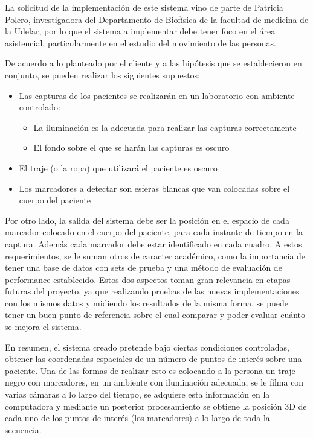 La solicitud de la implementación de este sistema vino de parte de Patricia Polero, investigadora del Departamento de Biofísica de la facultad de medicina de la Udelar, por lo que el sistema a implementar debe tener foco en el área asistencial, particularmente en el estudio del movimiento de las personas.

De acuerdo a lo planteado por el cliente y a las hipótesis que se establecieron en conjunto, se pueden realizar los siguientes supuestos:
\begin{itemize}
\item Las capturas de los pacientes se realizarán en un laboratorio con ambiente controlado:
	\begin{itemize}
		 \item La iluminación es la adecuada para realizar las  capturas correctamente
		 \item El fondo sobre el que se harán las capturas es oscuro
	\end{itemize}
\item El traje (o la ropa) que utilizará el paciente es oscuro
\item Los marcadores a detectar son esferas blancas que van colocadas sobre el cuerpo del paciente
\end{itemize}

Por otro lado, la salida del sistema debe ser la posición en el espacio de cada marcador colocado en el cuerpo del paciente, para cada instante de tiempo en la captura. Además cada marcador debe estar identificado en cada cuadro. A estos requerimientos, se le suman otros de caracter académico, como la importancia de tener una base de datos con sets de prueba y una método de evaluación de performance establecido. Estos dos aspectos toman gran relevancia en etapas futuras del proyecto, ya que realizando pruebas de las nuevas implementaciones con los mismos datos y midiendo los resultados de la misma forma, se puede tener un buen punto de referencia sobre el cual comparar y poder evaluar cuánto se mejora el sistema.

En resumen, el sistema creado pretende bajo ciertas condiciones controladas, obtener las coordenadas espaciales de un número de puntos de interés sobre una paciente. Una de las formas de realizar esto es colocando a la persona un traje negro con marcadores, en un ambiente con iluminación adecuada, se le filma con varias cámaras a lo largo del tiempo, se adquiere esta información en la computadora y mediante un posterior procesamiento se obtiene la posición 3D de cada uno de los puntos de interés (los marcadores) a lo largo de toda la secuencia.

